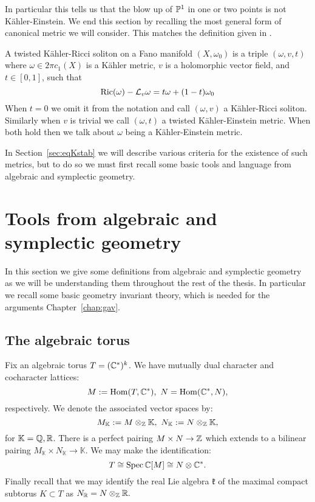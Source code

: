 In particular this tells us that the blow up of \(\mathbb{P}^1\) in one or two points is not K\"ahler-Einstein. We end this section by recalling the most general form of canonical metric we will consider. This matches the definition given in \cite[Definiton 3]{datar2016kahler}.
\begin{definition} \label{def:tKRS}
A twisted K\"ahler-Ricci soliton on a Fano manifold \((X,\omega_0)\) is a triple \((\omega,v, t)\) where \(\omega \in 2 \pi c_1(X)\) is a K\"ahler metric, \(v\) is a holomorphic vector field, and \(t \in [0,1]\), such that
\[
\mathop{\rm Ric}\nolimits(\omega) - \mathcal{L}_v \omega = t \omega + (1-t) \omega_0
\]
When \(t = 0\) we omit it from the notation and call \((\omega,v)\) a K\"ahler-Ricci soliton. Similarly when \(v\) is trivial we call \((\omega,t)\) a twisted K\"ahler-Einstein metric. When both hold then we talk about \(\omega\) being a K\"ahler-Einstein metric.
\end{definition}

In Section~\ref{sec:eqKstab} we will describe various criteria for the existence of such metrics, but to do so we must first recall some basic tools and language from algebraic and symplectic geometry.
\section{Tools from algebraic and symplectic geometry} \label{basics}
In this section we give some definitions from algebraic and symplectic geometry as we will be understanding them throughout the rest of the thesis. In particular we recall some basic geometry invariant theory, which is needed for the arguments Chapter~\ref{chap:gav}.
\subsection{The algebraic torus} \label{algtorus}
Fix an algebraic torus \(T = (\mathbb{C}^*)^k\). We have mutually dual character and cocharacter lattices:
\[
M := \operatorname{Hom}(T,\mathbb{C}^*), \ N = \operatorname{Hom}(\mathbb{C}^*,N),
\]
respectively. We denote the associated vector spaces by:
\[
M_\mathbb{K} := M \otimes_{\mathbb{Z}} \mathbb{K}, \ N_\mathbb{K} := N \otimes_{\mathbb{Z}} \mathbb{K},
\]
for \(\mathbb{K} = \mathbb{Q}, \mathbb{R}\). There is a perfect pairing \(M \times N \to \mathbb{Z}\) which extends to a bilinear pairing \(M_\mathbb{K} \times N_\mathbb{K} \to \mathbb{K}\). We may make the identification:
\[
T \cong \operatorname{Spec} \mathbb{C}[M] \cong N \otimes \mathbb{C}^*.
\]
Finally recall that we may identify the real Lie algebra \(\mathfrak{k}\) of the maximal compact subtorus \(K \subset T\) as \( N_{\mathbb{R}} = N \otimes_{\mathbb{Z}} \mathbb{R}.\)
